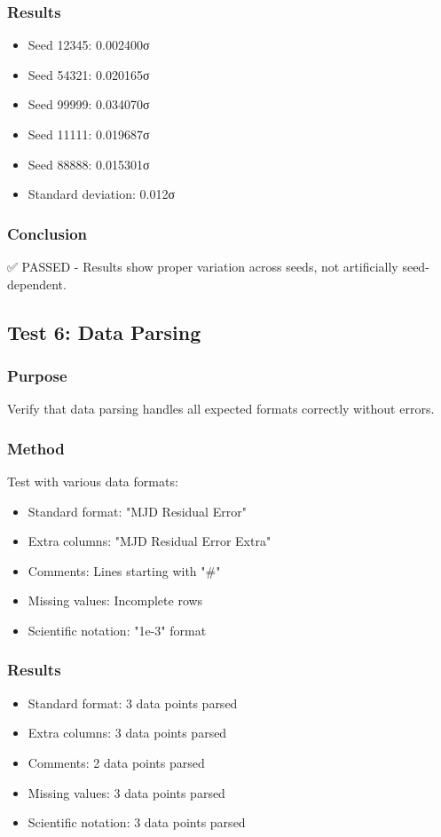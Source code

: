 \subsubsection{Results}
\begin{itemize}
    \item Seed 12345: 0.002400σ
    \item Seed 54321: 0.020165σ
    \item Seed 99999: 0.034070σ
    \item Seed 11111: 0.019687σ
    \item Seed 88888: 0.015301σ
    \item Standard deviation: 0.012σ
\end{itemize}

\subsubsection{Conclusion}
✅ PASSED - Results show proper variation across seeds, not artificially seed-dependent.

\subsection{Test 6: Data Parsing}

\subsubsection{Purpose}
Verify that data parsing handles all expected formats correctly without errors.

\subsubsection{Method}
Test with various data formats:
\begin{itemize}
    \item Standard format: "MJD Residual Error"
    \item Extra columns: "MJD Residual Error Extra"
    \item Comments: Lines starting with "#"
    \item Missing values: Incomplete rows
    \item Scientific notation: "1e-3" format
\end{itemize}

\subsubsection{Results}
\begin{itemize}
    \item Standard format: 3 data points parsed
    \item Extra columns: 3 data points parsed
    \item Comments: 2 data points parsed
    \item Missing values: 3 data points parsed
    \item Scientific notation: 3 data points parsed
\end{itemize}

